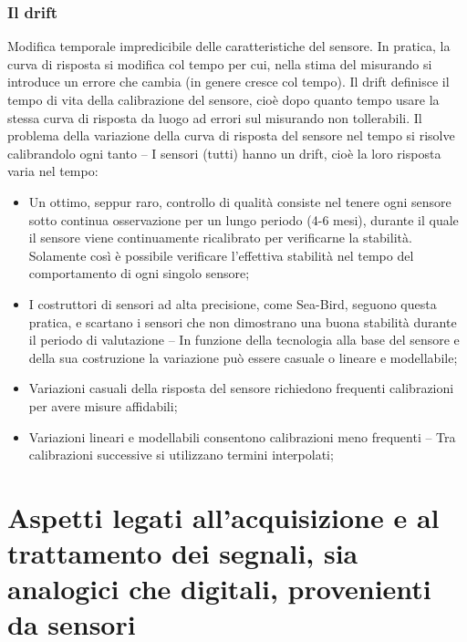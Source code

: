 \documentclass[a4paper,12pt]{article}
\begin{document}
\section{Il drift}
Modifica temporale impredicibile delle caratteristiche del sensore. In pratica, la curva di risposta si modifica col tempo per cui, nella stima del misurando si introduce un errore che cambia (in genere cresce col tempo). Il drift definisce il tempo di vita della calibrazione del sensore, cioè dopo quanto tempo usare la stessa curva di risposta da luogo ad errori sul misurando non tollerabili.
Il problema della variazione della curva di risposta del sensore nel tempo si risolve calibrandolo ogni tanto – I sensori (tutti) hanno un drift, cioè la loro risposta varia nel tempo:
\begin{itemize}
\item Un ottimo, seppur raro, controllo di qualità consiste nel tenere ogni sensore sotto continua osservazione per un lungo periodo (4-6 mesi), durante il quale il sensore viene continuamente ricalibrato per verificarne la stabilità. Solamente così è possibile verificare l'effettiva stabilità nel tempo del comportamento di ogni singolo sensore;
\item I costruttori di sensori ad alta precisione, come Sea-Bird, seguono questa pratica, e scartano i sensori che non dimostrano una buona stabilità durante il periodo di valutazione – In funzione della tecnologia alla base del sensore e della sua costruzione la variazione può essere casuale o lineare e modellabile;
\item Variazioni casuali della risposta del sensore richiedono frequenti calibrazioni per avere misure affidabili;
\item Variazioni lineari e modellabili consentono calibrazioni meno frequenti – Tra calibrazioni successive si utilizzano termini interpolati;
\end{itemize}

\part{Aspetti legati all'acquisizione e al trattamento dei segnali, sia analogici che digitali, provenienti da sensori}
\end{document}
